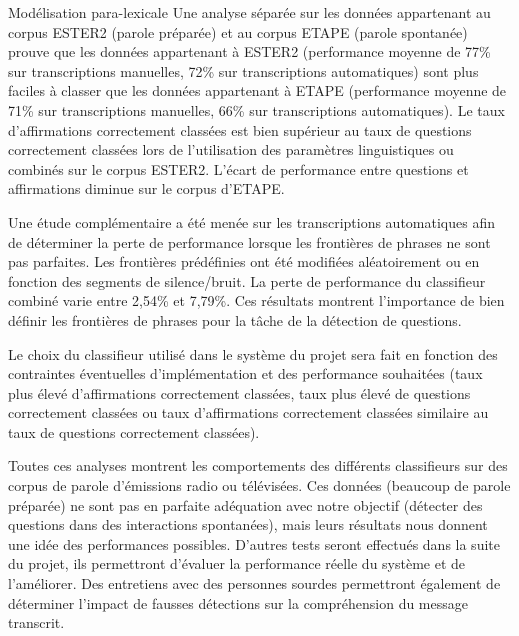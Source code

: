 \documentclass{style/these}
\begin{document}
\begin{part}{Modélisation para-lexicale}
Une analyse séparée sur les données appartenant au corpus ESTER2 (parole préparée) et au corpus ETAPE (parole spontanée) prouve que les données appartenant à ESTER2 (performance moyenne de 77\% sur transcriptions manuelles, 72\% sur transcriptions automatiques) sont plus faciles à classer que les données appartenant à ETAPE (performance moyenne de 71\% sur transcriptions manuelles, 66\% sur transcriptions automatiques). 
Le taux d'affirmations correctement classées est bien supérieur au taux de questions correctement classées lors de l'utilisation des paramètres linguistiques ou combinés sur le corpus ESTER2.  L'écart de performance entre questions et affirmations diminue sur le corpus d'ETAPE. 

Une étude complémentaire a été menée sur les transcriptions automatiques afin de déterminer la perte de performance lorsque les frontières de phrases ne sont pas parfaites. 
Les frontières prédéfinies ont été modifiées aléatoirement ou en fonction des segments de silence/bruit. 
La perte de performance du classifieur combiné varie entre 2,54\% et 7,79\%. 
Ces résultats montrent l'importance de bien définir les frontières de phrases pour la tâche de la détection de questions. 

Le choix du classifieur utilisé dans le système du projet sera fait en fonction des contraintes éventuelles d'implémentation et des performance souhaitées (taux plus élevé d'affirmations correctement classées, taux plus élevé de questions correctement classées ou taux d'affirmations correctement classées similaire au taux de questions correctement classées). 

Toutes ces analyses montrent les comportements des différents classifieurs sur des corpus de parole d'émissions radio ou télévisées. 
Ces données (beaucoup de parole préparée) ne sont pas en parfaite adéquation avec notre objectif (détecter des questions dans des interactions spontanées), mais leurs résultats nous donnent une idée des performances possibles. 
D'autres tests seront effectués dans la suite du projet, ils permettront d'évaluer la performance réelle du système et de l'améliorer. 
Des entretiens avec des personnes sourdes permettront également de déterminer l'impact de fausses détections sur la compréhension du message transcrit. 


\clearpage
\newpage

\stopcontents[parts]
\end{part}



\end{document}
